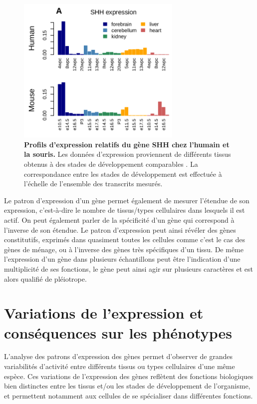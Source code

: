 \begin{figure}[h]
    \centering
    \includegraphics[width=0.7\textwidth, page=1] {figures/introduction/fig2.png}
    \caption[Profils d'expression relatifs du gène \acrshort{SHH} chez l'humain et la souris.]{
    \textbf{Profils d'expression relatifs du gène \acrshort{SHH} chez l'humain et la souris.}
    Les données d'expression proviennent de différents tissus obtenus à des stades de développement comparables \citep{cardoso-moreira_gene_2019}. La correspondance entre les stades de développement est effectuée à l'échelle de l'ensemble des transcrits mesurés.\\
    }
    \label{fig:Fig2}
\end{figure} 

Le patron d’expression d’un gène permet également de mesurer l’étendue de son expression, c’est-à-dire le nombre de tissus/types cellulaires dans lesquels il est actif. On peut également parler de la spécificité d’un gène qui correspond à l’inverse de son étendue. Le patron d’expression peut ainsi révéler des gènes constitutifs, exprimés dans quasiment toutes les cellules comme c’est le cas des gènes de ménage, ou à l’inverse des gènes très spécifiques d’un tissu. De même l’expression d’un gène dans plusieurs échantillons peut être l’indication d’une multiplicité de ses fonctions, le gène peut ainsi agir sur plusieurs caractères et est alors qualifié de pléiotrope.

\section{Variations de l’expression et conséquences sur les phénotypes}
\label{sec:variations-et-consequence}

L’analyse des patrons d’expression des gènes permet d’observer de grandes variabilités d’activité entre différents tissus ou types cellulaires d’une même espèce. Ces variations de l’expression des gènes reflètent des fonctions biologiques bien distinctes entre les tissus et/ou les stades de développement de l’organisme, et permettent notamment aux cellules de se spécialiser dans différentes fonctions. \\

